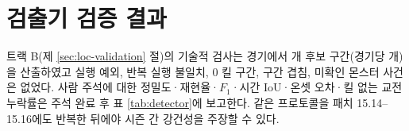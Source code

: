 
\section{검출기 검증 결과}
\label{sec:results-detector}

트랙 B(제 \ref{sec:loc-validation} 절)의 기술적 검사는 \numGoldMatches{} 경기에서 \numGoldCandidates{} 개 후보 구간(경기당 \goldCandidatesPerMatch{} 개)을 산출하였고 실행 예외, 반복 실행 불일치, 0 킬 구간, 구간 겹침, 미확인 몬스터 사건은 없었다. 사람 주석에 대한 정밀도·재현율·$F_1$·시간 IoU·온셋 오차·킬 없는 교전 누락률은 주석 완료 후 표 \ref{tab:detector}에 보고한다. 같은 프로토콜을 패치 15.14--15.16에도 반복한 뒤에야 시즌 간 강건성을 주장할 수 있다.


